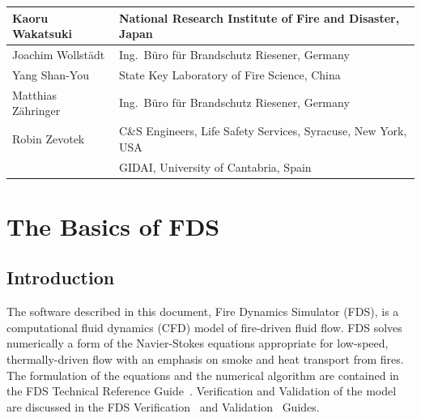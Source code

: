 \documentclass[11pt]{book}
\begin{document}
\begin{longtable}{|l|l|}
Kaoru Wakatsuki                         & National Research Institute of Fire and Disaster, Japan                  \\ \hline
Joachim Wollst\"{a}dt                   & Ing.~B\"{u}ro f\"{u}r Brandschutz Riesener, Germany                  \\ \hline
Yang Shan-You                           & State Key Laboratory of Fire Science, China                  \\ \hline
Matthias Z\"{a}hringer                  & Ing.~B\"{u}ro f\"{u}r Brandschutz Riesener, Germany                  \\ \hline
Robin Zevotek                           & C\&S Engineers, Life Safety Services, Syracuse, New York, USA                  \\ \hline

                                        & GIDAI, University of Cantabria, Spain                  \\ \hline
\end{longtable}







\setlength{\cftsecnumwidth}{0.45in}
\setlength{\cftsubsecnumwidth}{0.5in}
\setlength{\cftfignumwidth}{0.45in}
\setlength{\cfttabnumwidth}{0.45in}

\clearpage
\tableofcontents
\clearpage
\listoffigures
\clearpage
\listoftables

\mainmatter



\part{The Basics of FDS}


\chapter{Introduction}

The software described in this document, Fire Dynamics Simulator (FDS), is a computational
fluid dynamics (CFD) model of fire-driven fluid flow. FDS solves numerically a form of the
Navier-Stokes equations appropriate for low-speed, thermally-driven flow
with an emphasis on smoke and heat transport from fires.
The formulation of the equations and the numerical algorithm are contained in the FDS Technical Reference Guide~\cite{FDS_Math_Guide}.
Verification and Validation of the model are discussed in the FDS Verification~\cite{FDS_Verification_Guide} and Validation~\cite{FDS_Validation_Guide} Guides.
\end{document}
